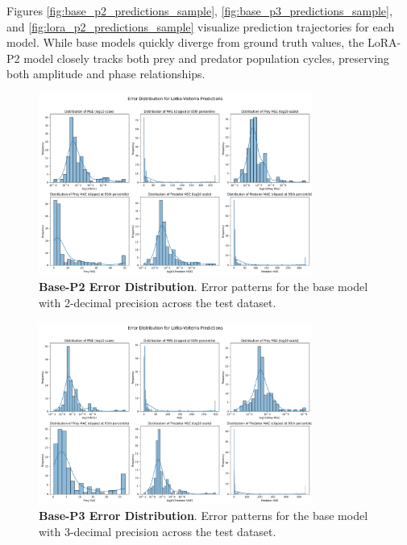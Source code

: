 \documentclass{article}
\begin{document}
Figures \ref{fig:base_p2_predictions_sample}, \ref{fig:base_p3_predictions_sample}, and \ref{fig:lora_p2_predictions_sample} visualize prediction trajectories for each model. While base models quickly diverge from ground truth values, the LoRA-P2 model closely tracks both prey and predator population cycles, preserving both amplitude and phase relationships. 

\begin{figure}[H]
    \centering
    \includegraphics[width=0.8\textwidth]{error_distributions_p2}
    \caption{\textbf{Base-P2 Error Distribution}. Error patterns for the base model with 2-decimal precision across the test dataset.}
    \label{fig:error_p2}
\end{figure}

\begin{figure}[H]
    \centering
    \includegraphics[width=0.8\textwidth]{error_distributions_p3}
    \caption{\textbf{Base-P3 Error Distribution}. Error patterns for the base model with 3-decimal precision across the test dataset.}
    \label{fig:error_p3}
\end{figure}
\end{document}

